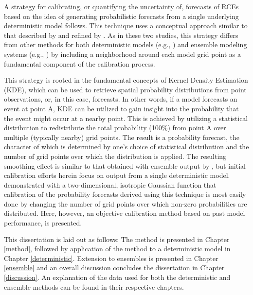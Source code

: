 A strategy for calibrating, or quantifying the uncertainty of, forecasts of RCEs based on the idea of generating probabilistic forecasts from a single underlying deterministic model follows. This technique uses a conceptual approach similar to that described by \cite{Theis2005} and refined by \cite{Sobash2011}. As in these two studies, this strategy differs from other methods for both deterministic models (e.g., \citealp{Glahn1972}) and ensemble modeling systems (e.g., \citealp{Hamill1998, Raftery2005, Clark2009, Glahn2009}) by including a neighborhood around each model grid point as a fundamental component of the calibration process.

This strategy is rooted in the fundamental concepts of Kernel Density Estimation (KDE), which can be used to retrieve spatial probability distributions from point observations, or, in this case, forecasts. In other words, if a model forecasts an event at point A, KDE can be utilized to gain insight into the probability that the event might occur at a nearby point. This is achieved by utilizing a statistical distribution to redistribute the total probability (100\%) from point A over multiple (typically nearby) grid points. The result is a probability forecast, the character of which is determined by one's choice of statistical distribution and the number of grid points over which the distribution is applied. The resulting smoothing effect is similar to that obtained with ensemble output by \cite{Wilks2002}, but initial calibration efforts herein focus on output from a single deterministic model. \cite{Sobash2011} demonstrated with a two-dimensional, isotropic Gaussian function that calibration of the probability forecasts derived using this technique is most easily done by changing the number of grid points over which non-zero probabilities are distributed. Here, however, an objective calibration method based on past model performance, is presented.

This dissertation is laid out as follows: The method is presented in Chapter \ref{method}, followed by application of the method to a deterministic model in Chapter \ref{deterministic}. Extension to ensembles is presented in Chapter \ref{ensemble} and an overall discussion concludes the dissertation in Chapter \ref{discussion}. An explanation of the data used for both the deterministic and ensemble methods can be found in their respective chapters.


